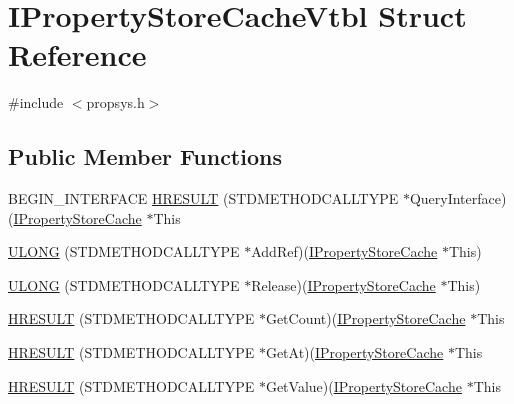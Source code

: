 \hypertarget{struct_i_property_store_cache_vtbl}{}\section{I\+Property\+Store\+Cache\+Vtbl Struct Reference}
\label{struct_i_property_store_cache_vtbl}


{\ttfamily \#include $<$propsys.\+h$>$}

\subsection*{Public Member Functions}
\begin{DoxyCompactItemize}
\item 
B\+E\+G\+I\+N\+\_\+\+I\+N\+T\+E\+R\+F\+A\+CE \hyperlink{struct_i_property_store_cache_vtbl_ab17e3ee1134ce73a5bf89984c18cf886}{H\+R\+E\+S\+U\+LT} (S\+T\+D\+M\+E\+T\+H\+O\+D\+C\+A\+L\+L\+T\+Y\+PE $\ast$Query\+Interface)(\hyperlink{propsys_8h_a0a3e54b7ffa811dc2b6196380447f4e7}{I\+Property\+Store\+Cache} $\ast$This
\item 
\hyperlink{struct_i_property_store_cache_vtbl_aa0e6187c9ab5e95020a225ef2e5c8662}{U\+L\+O\+NG} (S\+T\+D\+M\+E\+T\+H\+O\+D\+C\+A\+L\+L\+T\+Y\+PE $\ast$Add\+Ref)(\hyperlink{propsys_8h_a0a3e54b7ffa811dc2b6196380447f4e7}{I\+Property\+Store\+Cache} $\ast$This)
\item 
\hyperlink{struct_i_property_store_cache_vtbl_a90fc546c8feff965f74d6997081db1f5}{U\+L\+O\+NG} (S\+T\+D\+M\+E\+T\+H\+O\+D\+C\+A\+L\+L\+T\+Y\+PE $\ast$Release)(\hyperlink{propsys_8h_a0a3e54b7ffa811dc2b6196380447f4e7}{I\+Property\+Store\+Cache} $\ast$This)
\item 
\hyperlink{struct_i_property_store_cache_vtbl_a5addc05008ca9d386a07e99b8ecff07c}{H\+R\+E\+S\+U\+LT} (S\+T\+D\+M\+E\+T\+H\+O\+D\+C\+A\+L\+L\+T\+Y\+PE $\ast$Get\+Count)(\hyperlink{propsys_8h_a0a3e54b7ffa811dc2b6196380447f4e7}{I\+Property\+Store\+Cache} $\ast$This
\item 
\hyperlink{struct_i_property_store_cache_vtbl_a0bdb984c7313fbed19ef8293a1d595c7}{H\+R\+E\+S\+U\+LT} (S\+T\+D\+M\+E\+T\+H\+O\+D\+C\+A\+L\+L\+T\+Y\+PE $\ast$Get\+At)(\hyperlink{propsys_8h_a0a3e54b7ffa811dc2b6196380447f4e7}{I\+Property\+Store\+Cache} $\ast$This
\item 
\hyperlink{struct_i_property_store_cache_vtbl_a89be5fa10bc5acaa942cce5c76030f92}{H\+R\+E\+S\+U\+LT} (S\+T\+D\+M\+E\+T\+H\+O\+D\+C\+A\+L\+L\+T\+Y\+PE $\ast$Get\+Value)(\hyperlink{propsys_8h_a0a3e54b7ffa811dc2b6196380447f4e7}{I\+Property\+Store\+Cache} $\ast$This

\end{DoxyCompactItemize}
